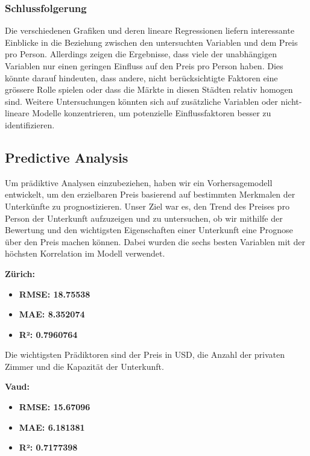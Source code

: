 \documentclass[
  journal,
]{IEEEtran}%
\begin{document}
\hypertarget{schlussfolgerung}{%
\subsubsection{Schlussfolgerung}\label{schlussfolgerung}}

Die verschiedenen Grafiken und deren lineare Regressionen liefern
interessante Einblicke in die Beziehung zwischen den untersuchten
Variablen und dem Preis pro Person. Allerdings zeigen die Ergebnisse,
dass viele der unabhängigen Variablen nur einen geringen Einfluss auf
den Preis pro Person haben. Dies könnte darauf hindeuten, dass andere,
nicht berücksichtigte Faktoren eine grössere Rolle spielen oder dass die
Märkte in diesen Städten relativ homogen sind. Weitere Untersuchungen
könnten sich auf zusätzliche Variablen oder nicht-lineare Modelle
konzentrieren, um potenzielle Einflussfaktoren besser zu identifizieren.

\hypertarget{predictive-analysis-1}{%
\subsection{Predictive Analysis}\label{predictive-analysis-1}}

Um prädiktive Analysen einzubeziehen, haben wir ein Vorhersagemodell
entwickelt, um den erzielbaren Preis basierend auf bestimmten Merkmalen
der Unterkünfte zu prognostizieren. Unser Ziel war es, den Trend des
Preises pro Person der Unterkunft aufzuzeigen und zu untersuchen, ob wir
mithilfe der Bewertung und den wichtigsten Eigenschaften einer
Unterkunft eine Prognose über den Preis machen können. Dabei wurden die
sechs besten Variablen mit der höchsten Korrelation im Modell verwendet.

\textbf{Zürich:}

\begin{itemize}
\item
  \textbf{RMSE: 18.75538}
\item
  \textbf{MAE: 8.352074}
\item
  \textbf{R²: 0.7960764}
\end{itemize}

Die wichtigsten Prädiktoren sind der Preis in USD, die Anzahl der
privaten Zimmer und die Kapazität der Unterkunft.

\textbf{Vaud:}

\begin{itemize}
\item
  \textbf{RMSE: 15.67096}
\item
  \textbf{MAE: 6.181381}
\item
  \textbf{R²: 0.7177398}
\end{itemize}
\end{document}
